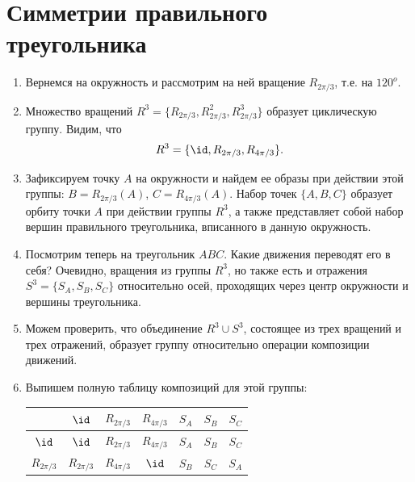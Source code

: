 
\section{Симметрии правильного треугольника}


\begin{enumerate}
\item Вернемся на окружность и рассмотрим на ней вращение $R_{2\pi/3}$, т.е. на $120^o$.
\item Множество вращений $R^3=\{R_{2\pi/3},R_{2\pi/3}^2,R_{2\pi/3}^3\}$ образует циклическую группу. Видим, что
$$
R^3 = \{\id,R_{2\pi/3},R_{4\pi/3}\}.
$$
\item Зафиксируем точку $A$ на окружности и найдем ее образы при действии этой группы: $B=R_{2\pi/3}(A)$, $C=R_{4\pi/3}(A)$. Набор точек $\{A,B,C\}$ образует орбиту точки $A$ при действии группы $R^3$, а также представляет собой набор вершин правильного треугольника, вписанного в данную окружность.
\item Посмотрим теперь на треугольник $ABC$. Какие движения переводят его в себя? Очевидно, вращения из группы $R^3$, но также есть и отражения $S^3=\{S_A, S_B, S_C\}$ относительно осей, проходящих через центр окружности и вершины треугольника.
\item Можем проверить, что объединение $R^3\cup S^3$, состоящее из трех вращений и трех отражений, образует группу относительно операции композиции движений.
\item Выпишем полную таблицу композиций для этой группы:
\begin{table}[htb!]\begin{center}
\begin{tabular}{c||c|c|c||c|c|c|}
             & $\id$        & $R_{2\pi/3}$ & $R_{4\pi/3}$ & $S_A$        & $S_B$        & $S_C$  \\
\hline\hline
$\id$        & $\id$        & $R_{2\pi/3}$ & $R_{4\pi/3}$ & $S_A$        & $S_B$        & $S_C$  \\  \hline
$R_{2\pi/3}$ & $R_{2\pi/3}$ & $R_{4\pi/3}$ & $\id$        & $S_B$        & $S_C$        & $S_A$  \\  \hline

\end{tabular}
\end{center}
\end{table}
\end{enumerate}
